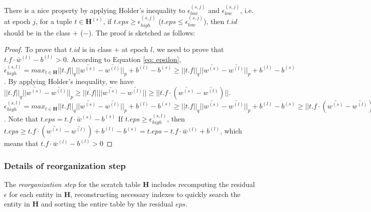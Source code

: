 There is a nice property by applying Holder's inequality \cite{rudin1976principles} to $\epsilon_{low}^{(s,j)}$ and $\epsilon_{low}^{(s,j)}$, i.e. at epoch $j$, for a tuple $t \in \textbf{H}^{(s)}$, if $t.eps \geq \epsilon_{high}^{(s,j)}$ ($t.eps \leq \epsilon_{low}^{(s,j)}$), then $t.id$ should be in the class $+$ ($-$). The proof is sketched as follows:

\begin{proof}
To prove that $t.id$ is in class $+$ at epoch $l$, we need to prove that $t.f\cdot \bar{w}^{(l)} - b^{(l)} > 0$. According to Equation \ref{eq: epsilon},
$\epsilon_{high}^{(s,l)} = max_{t \in \textbf{H}}||t.f||_q||\bar{w^{(s)}}-\bar{w^{(l)}}||_p+b^{(l)}-b^{(s)} \geq ||t.f||_q||\bar{w^{(s)}}-\bar{w^{(l)}}||_p+b^{(l)}-b^{(s)}$. By applying Holder's inequality, we have $||t.f||_q||\bar{w^{(s)}}-\bar{w^{(l)}}||_p \geq ||t.f||||\bar{w^{(s)}}-\bar{w^{(l)}}|| \geq ||t.f \cdot(\bar{w^{(s)}}-\bar{w^{(l)}})||$. $\epsilon_{high}^{(s,l)} = max_{t \in \textbf{H}}||t.f||_q||\bar{w^{(s)}}-\bar{w^{(l)}}||_p+b^{(l)}-b^{(s)} \geq ||t.f||_q||\bar{w^{(s)}}-\bar{w^{(l)}}||_p+b^{(l)}-b^{(s)} \geq ||t.f \cdot (\bar{w^{(s)}}-\bar{w^{(l)}})|| + b^{(l)}-b^{(s)} \geq t.f \cdot (\bar{w^{(s)}}-\bar{w^{(l)}}) + b^{(l)}-b^{(s)}$. Note that $t.eps = t.f \cdot \bar{w}^{(s)} - b^{(s)}$ If $t.eps \geq \epsilon_{high}^{(s,l)}$, then $t.eps \geq t.f \cdot (\bar{w^{(s)}}-\bar{w^{(l)}}) + b^{(l)}-b^{(s)} = t.eps - t.f \cdot \bar{w}^{(l)} + b^{(l)}$, which means that $t.f\cdot \bar{w}^{(l)} - b^{(l)} > 0$
\end{proof}

\subsubsection{Details of reorganization step}
The {\em reorganization step} for the scratch table $\textbf{H}$ includes recomputing the residual $\epsilon$ for each entity in $\textbf{H}$, reconstructing necessary indexes to quickly search the entity in $\textbf{H}$ and sorting the entire table by the residual $eps$.


